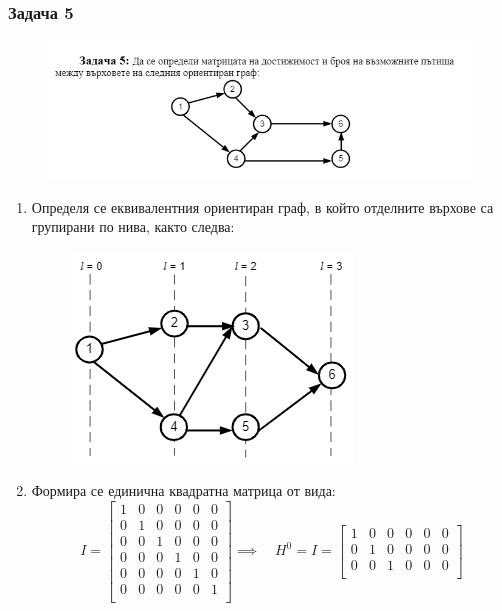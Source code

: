 \documentclass[fleqn, 12pt]{article}
\theoremstyle{definition}
\begin{document}
\subsubsection*{Задача 5}
\begin{figure} [htp!]
\includegraphics[width = \linewidth]{Pics/Discrete math/ex8/ex8-task5.png}
\end{figure}
\begin{enumerate}
\item Определя се еквивалентния ориентиран граф, в който отделните  върхове са групирани по нива, както следва:
\begin{figure} [htp!]
\centering
\includegraphics{Pics/Discrete math/ex8/ex8-task5-1.png}
\end{figure}
\item Формира се единична квадратна матрица от вида:
$$
I = 
\begin{bmatrix}
1 & 0 & 0 & 0 & 0 & 0 \\
0 & 1 & 0 & 0 & 0 & 0 \\
0 & 0 & 1 & 0 & 0 & 0 \\
0 & 0 & 0 & 1 & 0 & 0 \\
0 & 0 & 0 & 0 & 1 & 0 \\
0 & 0 & 0 & 0 & 0 & 1  \\
\end{bmatrix} 
\implies \quad 
H^0 = I = 
\begin{bmatrix}
1 & 0 & 0 & 0 & 0 & 0 \\
0 & 1 & 0 & 0 & 0 & 0 \\
0 & 0 & 1 & 0 & 0 & 0 \\

\end{bmatrix}$$
\end{enumerate}
\end{document}
